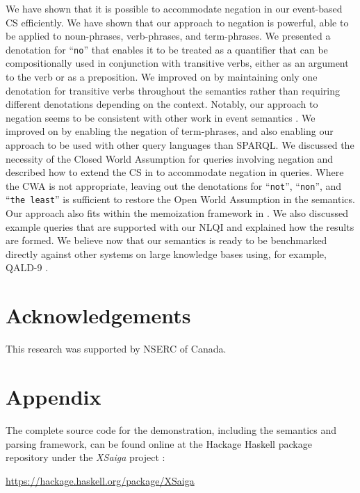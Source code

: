 \documentclass[../main.tex]{subfiles}
\begin{document}
\begin{refsection}
\noindent We have shown that it is possible to accommodate negation in our event-based CS efficiently.  We have shown that our approach to negation is powerful, able to be applied to noun-phrases, verb-phrases, and term-phrases.  We presented a denotation for ``\texttt{no}'' that enables it to be treated as a quantifier that can be compositionally used in conjunction with transitive verbs, either as an argument to the verb or as a preposition.  We improved on \cite{frostboulos2002} by maintaining only one denotation for transitive verbs throughout the semantics rather than requiring different denotations depending on the context.  Notably, our approach to negation seems to be consistent with other work in event semantics \cite{champollion2011}.  We improved on \cite{ferre2013squall} by enabling the negation of term-phrases, and also enabling our approach to be used with other query languages than SPARQL.  We discussed the necessity of the Closed World Assumption for queries involving negation and described how to extend the CS in \cite{frostpeelar2019} to accommodate negation in queries.  Where the CWA is not appropriate, leaving out the denotations for ``\texttt{not}'', ``\texttt{non}'', and ``\texttt{the least}'' is sufficient to restore the Open World Assumption in the semantics.  Our approach also fits within the memoization framework in \cite{frostpeelar2019}. We also discussed example queries that are supported with our NLQI and explained how the results are formed.
We believe now that our semantics is ready to be benchmarked directly against other systems on large knowledge bases using, for example, QALD-9 \cite{qald9}.

\section*{Acknowledgements}

\noindent This research was supported by NSERC of Canada.

%


\section*{Appendix}

\noindent The complete source code for the demonstration, including the semantics and parsing framework, can be found online at the Hackage Haskell package repository under the \textit{XSaiga} project \cite{xsaiga}:

\begin{center}
	\url{https://hackage.haskell.org/package/XSaiga}
\end{center}

\printbibliography[heading=subbibintoc]

\end{refsection}
\end{document}
